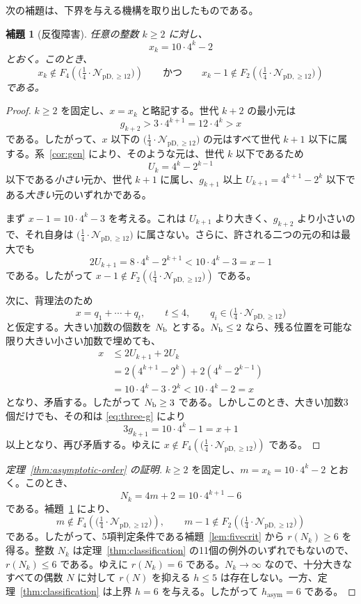 \documentclass[12pt]{ltjsarticle}
\theoremstyle{plain}
\newtheorem{lemma}[theorem]{補題}
\theoremstyle{definition}
\theoremstyle{plain}
\newcommand{\Pset}{%
  \bigl(\tfrac{1}{4}\cdot\mathcal{N}_{\mathrm{pD},\geq 12}\bigr)%
}
\begin{document}
次の補題は、下界を与える機構を取り出したものである。

\begin{lemma}[反復障害]\label{lem:obstruction}
任意の整数 $k\geq2$ に対し、
\[
  x_k=10\cdot4^k-2
\]
とおく。このとき、
\begin{equation}\label{eq:obstruction}
  x_k\notin F_4(\Pset)
  \qquad\text{かつ}\qquad
  x_k-1\notin F_2(\Pset)
\end{equation}
である。
\end{lemma}

\begin{proof}
$k\geq2$ を固定し、$x=x_k$ と略記する。世代 $k+2$ の最小元は
\[
  g_{k+2}>3\cdot4^{k+1}=12\cdot4^k>x
\]
である。したがって、$x$ 以下の $\Pset$ の元はすべて世代 $k+1$ 以下に属する。系~\ref{cor:gen} により、そのような元は、世代 $k$ 以下であるため
\[
  U_k=4^k-2^{k-1}
\]
以下である\emph{小さい}元か、世代 $k+1$ に属し、$g_{k+1}$ 以上 $U_{k+1}=4^{k+1}-2^k$ 以下である\emph{大きい}元のいずれかである。

まず $x-1=10\cdot4^k-3$ を考える。これは $U_{k+1}$ より大きく、$g_{k+2}$ より小さいので、それ自身は $\Pset$ に属さない。さらに、許される二つの元の和は最大でも
\[
  2U_{k+1}=8\cdot4^k-2^{k+1}<10\cdot4^k-3=x-1
\]
である。したがって $x-1\notin F_2(\Pset)$ である。

次に、背理法のため
\[
  x=q_1+\cdots+q_t,\qquad t\leq4,\qquad q_i\in\Pset
\]
と仮定する。大きい加数の個数を ${N_{\rm b}}$ とする。${N_{\rm b}}\leq2$ なら、残る位置を可能な限り大きい小さい加数で埋めても、
\begin{align*}
  x
  &\leq2U_{k+1}+2U_k\\
  &=2(4^{k+1}-2^k)+2(4^k-2^{k-1})\\
  &=10\cdot4^k-3\cdot2^k
  <10\cdot4^k-2=x
\end{align*}
となり、矛盾する。したがって ${N_{\rm b}}\geq3$ である。しかしこのとき、大きい加数3個だけでも、その和は \eqref{eq:three-g} により
\[
  3g_{k+1}=10\cdot4^k-1=x+1
\]
以上となり、再び矛盾する。ゆえに $x\notin F_4(\Pset)$ である。
\end{proof}

\begin{proof}[定理~\ref{thm:asymptotic-order} の証明]
$k\geq2$ を固定し、$m=x_k=10\cdot4^k-2$ とおく。このとき、
\[
  N_k=4m+2=10\cdot4^{k+1}-6
\]
である。補題~\ref{lem:obstruction} により、
\[
  m\notin F_4(\Pset),\qquad m-1\notin F_2(\Pset)
\]
である。したがって、5項判定条件である補題~\ref{lem:fivecrit} から $r(N_k)\geq6$ を得る。整数 $N_k$ は定理~\ref{thm:classification} の11個の例外のいずれでもないので、$r(N_k)\leq6$ である。ゆえに $r(N_k)=6$ である。$N_k\to\infty$ なので、十分大きなすべての偶数 $N$ に対して $r(N)$ を抑える $h\leq5$ は存在しない。一方、定理~\ref{thm:classification} は上界 $h=6$ を与える。したがって $h_{\mathrm{asym}}=6$ である。
\end{proof}
\end{document}
